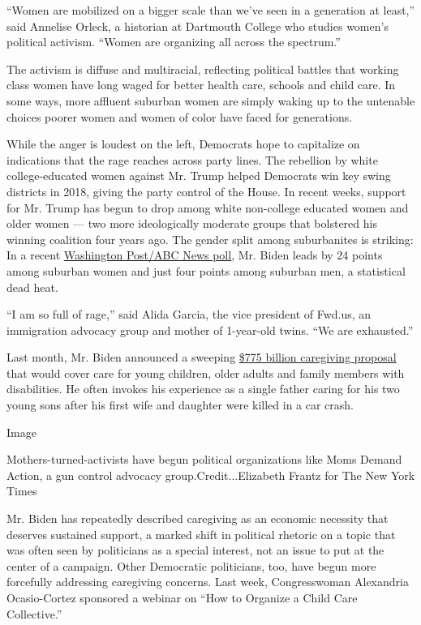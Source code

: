 ``Women are mobilized on a bigger scale than we've seen in a generation
at least,'' said Annelise Orleck, a historian at Dartmouth College who
studies women's political activism. ``Women are organizing all across
the spectrum.''

The activism is diffuse and multiracial, reflecting political battles
that working class women have long waged for better health care, schools
and child care. In some ways, more affluent suburban women are simply
waking up to the untenable choices poorer women and women of color have
faced for generations.

While the anger is loudest on the left, Democrats hope to capitalize on
indications that the rage reaches across party lines. The rebellion by
white college-educated women against Mr. Trump helped Democrats win key
swing districts in 2018, giving the party control of the House. In
recent weeks, support for Mr. Trump has begun to drop among white
non-college educated women and older women --- two more ideologically
moderate groups that bolstered his winning coalition four years ago. The
gender split among suburbanites is striking: In a recent
\href{https://www.langerresearch.com/wp-content/uploads/1214a22020Election.pdf}{Washington
Post/ABC News poll}, Mr. Biden leads by 24 points among suburban women
and just four points among suburban men, a statistical dead heat.

``I am so full of rage,'' said Alida Garcia, the vice president of
Fwd.us, an immigration advocacy group and mother of 1-year-old twins.
``We are exhausted.''

Last month, Mr. Biden announced a sweeping
\href{https://www.nytimes3xbfgragh.onion/2020/07/21/us/politics/biden-workplace-childcare.html}{\$775
billion caregiving proposal} that would cover care for young children,
older adults and family members with disabilities. He often invokes his
experience as a single father caring for his two young sons after his
first wife and daughter were killed in a car crash.

Image

Mothers-turned-activists have begun political organizations like Moms
Demand Action, a gun control advocacy group.Credit...Elizabeth Frantz
for The New York Times

Mr. Biden has repeatedly described caregiving as an economic necessity
that deserves sustained support, a marked shift in political rhetoric on
a topic that was often seen by politicians as a special interest, not an
issue to put at the center of a campaign. Other Democratic politicians,
too, have begun more forcefully addressing caregiving concerns. Last
week, Congresswoman Alexandria Ocasio-Cortez sponsored a webinar on
``How to Organize a Child Care Collective.''

